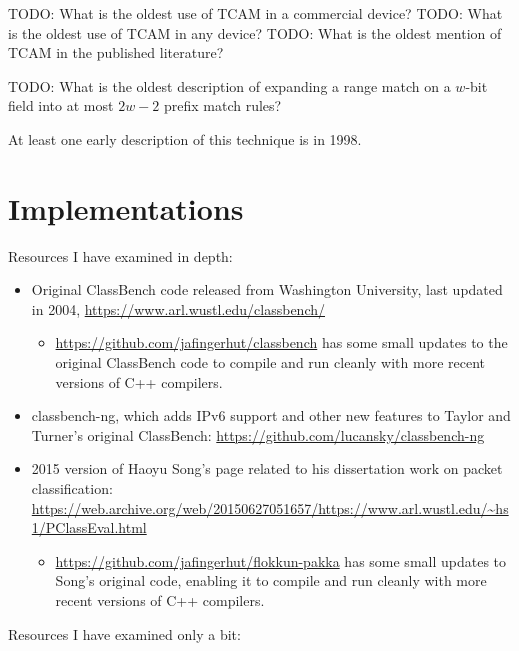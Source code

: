 \documentclass[acmsmall]{acmart}
\newcommand{\todo}[1]{}
\renewcommand{\todo}[1]{{\color{red} TODO: {#1}}}
\begin{document}
\todo{What is the oldest use of TCAM in a commercial device?}
\todo{What is the oldest use of TCAM in any device?}
\todo{What is the oldest mention of TCAM in the published literature?}

\todo{What is the oldest description of expanding a range match on a
  $w$-bit field into at most $2w-2$ prefix match rules?}

At least one early description of this technique is in
1998\cite[Sec. 4]{SVSW1998}.


\section{Implementations}

Resources I have examined in depth:

\begin{itemize}
\item Original ClassBench code released from Washington University,
  last updated in 2004, \url{https://www.arl.wustl.edu/classbench/}
  \begin{itemize}
  \item \url{https://github.com/jafingerhut/classbench} has some
    small updates to the original ClassBench code to compile and
    run cleanly with more recent versions of C++ compilers.
  \end{itemize}
\item classbench-ng, which adds IPv6 support and other new features
  to Taylor and Turner's original ClassBench:
  \url{https://github.com/lucansky/classbench-ng}
\item 2015 version of Haoyu Song's page
  related to his dissertation work on packet classification:
  \url{https://web.archive.org/web/20150627051657/https://www.arl.wustl.edu/~hs1/PClassEval.html}
  \begin{itemize}
  \item \url{https://github.com/jafingerhut/flokkun-pakka} has some
    small updates to Song's original code, enabling it to compile and
    run cleanly with more recent versions of C++ compilers.
  \end{itemize}
\end{itemize}

Resources I have examined only a bit:
\end{document}
